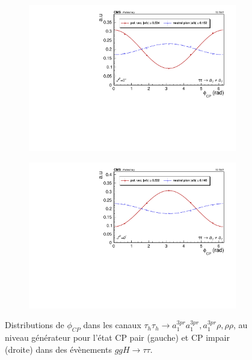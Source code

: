 \begin{figure}[]
    \begin{subfigure}[b]{0.5\linewidth}
    \centering
    \includegraphics[width=\linewidth]{Chapitre6/Images/A1A1/A1A1_even_gen.pdf} 
    \caption*{} 
    \vspace{0.5ex}
  \end{subfigure}%
  \begin{subfigure}[b]{0.5\linewidth}
    \centering
    \includegraphics[width=\linewidth]{Chapitre6/Images/A1A1/A1A1_odd_gen.pdf} 
    \caption*{} 
    \vspace{0.5ex}
  \end{subfigure} 
  \caption{Distributions de $\phi_{CP}$ dans les canaux $\tau_h\tau_h\rightarrow a_1^{3pr}a_1^{3pr},a_1^{3pr}\rho,\rho\rho$, au niveau générateur pour l'état CP pair (gauche) et CP impair (droite) dans des évènements $ggH\to\tau\tau$.}
  \label{CPgen}
\end{figure}



